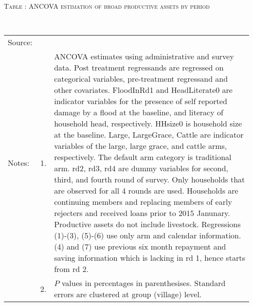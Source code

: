 \hspace{-1cm}\begin{minipage}[t]{14cm}
\hfil\textsc{\normalsize Table \thetable: ANCOVA estimation of broad productive assets by period\label{tab ANCOVA productive assets timevarying}}\\
\setlength{\tabcolsep}{1pt}
\setlength{\baselineskip}{8pt}
\renewcommand{\arraystretch}{.55}
\hfil{}\\
\renewcommand{\arraystretch}{.8}
\setlength{\tabcolsep}{1pt}
\begin{tabular}{>{\hfill\scriptsize}p{1cm}<{}>{\hfill\scriptsize}p{.25cm}<{}>{\scriptsize}p{12cm}<{\hfill}}
Source:& \multicolumn{2}{l}{\scriptsize Estimated with GUK administrative and survey data.}\\
Notes: & 1. & ANCOVA estimates using administrative and survey data. Post treatment regressands are regressed on categorical variables, pre-treatment regressand and other covariates. \textsf{FloodInRd1} and \textsf{HeadLiterate0} are indicator variables for the presence of self reported damage by a flood at the baseline, and literacy of household head, respectively. \textsf{HHsize0} is household size at the baseline. \textsf{Large}, \textsf{LargeGrace}, \textsf{Cattle} are indicator variables of the \textsf{large}, \textsf{large grace}, and \textsf{cattle} arms, respectively. The default arm category is \textsf{traditional} arm. \textsf{rd2, rd3, rd4} are dummy variables for second, third, and fourth round of survey. Only households that are observed for all 4 rounds are used. Households are continuing members and replacing members of early rejecters and received loans prior to 2015 Janunary. Productive assets do not include livestock. Regressions (1)-(3), (5)-(6) use only arm and calendar information. (4) and (7) use previous six month repayment and saving information which is lacking in rd 1, hence starts from rd 2.\\
& 2. & $P$ values in percentages in parenthesises. Standard errors are clustered at group (village) level.
\end{tabular}
\end{minipage}

